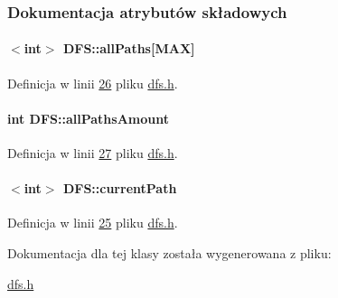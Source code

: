 \subsubsection{Dokumentacja atrybutów składowych}
\hypertarget{class_d_f_s_a48dd546aaa57234bcd6e54a0f01b3f48}{
\paragraph[{all\-Paths}]{$<$int$>$ D\-F\-S\-::all\-Paths\mbox{[}{\bf M\-A\-X}\mbox{]}}}\label{class_d_f_s_a48dd546aaa57234bcd6e54a0f01b3f48}


Definicja w linii \hyperlink{dfs_8h_source_l00026}{26} pliku \hyperlink{dfs_8h_source}{dfs.\-h}.

\hypertarget{class_d_f_s_a53269340075995e432c355638ce30554}{
\paragraph[{all\-Paths\-Amount}]{\setlength{\rightskip}{0pt plus 5cm}int D\-F\-S\-::all\-Paths\-Amount}}\label{class_d_f_s_a53269340075995e432c355638ce30554}


Definicja w linii \hyperlink{dfs_8h_source_l00027}{27} pliku \hyperlink{dfs_8h_source}{dfs.\-h}.

\hypertarget{class_d_f_s_aa3bf5c11cd2d66fc893e232eb1e42c76}{
\paragraph[{current\-Path}]{$<$int$>$ D\-F\-S\-::current\-Path}}\label{class_d_f_s_aa3bf5c11cd2d66fc893e232eb1e42c76}


Definicja w linii \hyperlink{dfs_8h_source_l00025}{25} pliku \hyperlink{dfs_8h_source}{dfs.\-h}.



Dokumentacja dla tej klasy została wygenerowana z pliku\-:\begin{DoxyCompactItemize}
\item 
\hyperlink{dfs_8h}{dfs.\-h}\end{DoxyCompactItemize}
